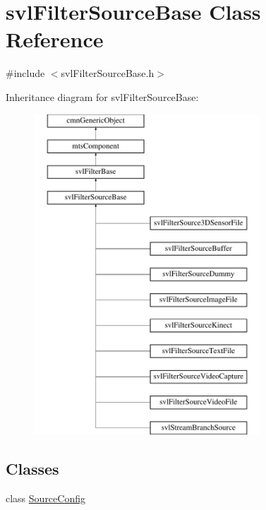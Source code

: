 \hypertarget{classsvl_filter_source_base}{\section{svl\-Filter\-Source\-Base Class Reference}
\label{classsvl_filter_source_base}
}


{\ttfamily \#include $<$svl\-Filter\-Source\-Base.\-h$>$}

Inheritance diagram for svl\-Filter\-Source\-Base\-:\begin{figure}[H]
\begin{center}
\leavevmode
\includegraphics[height=12.000000cm]{df/db9/classsvl_filter_source_base}
\end{center}
\end{figure}
\subsection*{Classes}
\begin{DoxyCompactItemize}
\item 
class \hyperlink{classsvl_filter_source_base_1_1_source_config}{Source\-Config}
\end{DoxyCompactItemize}
